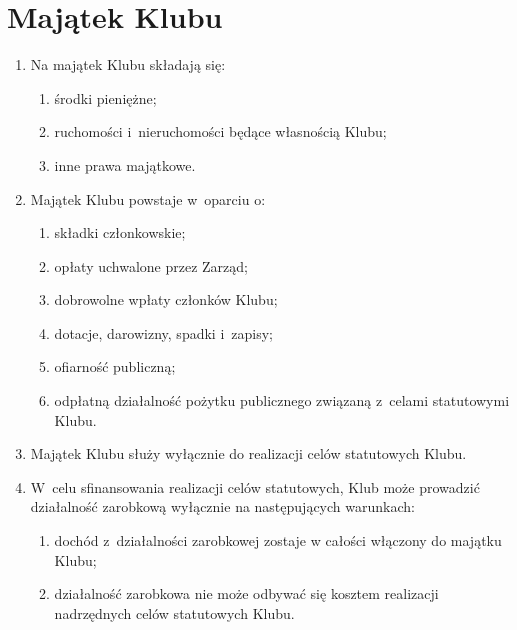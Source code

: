 \section{Majątek Klubu}
\begin{enumerate}
    \item Na majątek Klubu składają się:
    \begin{enumerate}
        \item środki pieniężne;
        \item ruchomości i~nieruchomości będące własnością Klubu;
        \item inne prawa majątkowe.
    \end{enumerate}
    \item Majątek Klubu powstaje w~oparciu o:
    \begin{enumerate}
        \item składki członkowskie;
        \item opłaty uchwalone przez Zarząd;
        \item dobrowolne wpłaty członków Klubu;
        \item dotacje, darowizny, spadki i~zapisy;
        \item ofiarność publiczną;
        \item odpłatną działalność pożytku publicznego związaną z~celami statutowymi Klubu.
    \end{enumerate}
    \item Majątek Klubu służy wyłącznie do realizacji celów statutowych Klubu.
    \item W~celu sfinansowania realizacji celów statutowych, Klub może prowadzić działalność zarobkową wyłącznie na następujących warunkach:
    \begin{enumerate}
        \item dochód z~działalności zarobkowej zostaje w całości włączony do majątku Klubu;
        \item działalność zarobkowa nie może odbywać się kosztem realizacji nadrzędnych celów statutowych Klubu.
    \end{enumerate}
\end{enumerate}